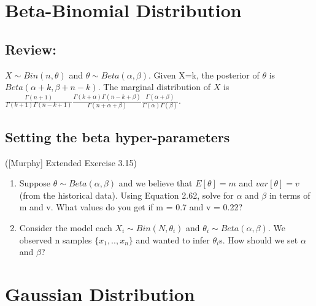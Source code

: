 \documentclass{harvardml}
\theoremstyle{definition}
\theoremstyle{plain}
\begin{document}

\section{Beta-Binomial Distribution}
\subsection{Review: }
$X\sim Bin(n, \theta)$ and $\theta\sim Beta(\alpha, \beta)$. Given X=k, the posterior of $\theta$ is $Beta(\alpha + k, \beta + n - k)$. The marginal distribution of $X$ is ${\frac  {\Gamma (n+1)}{\Gamma (k+1)\Gamma (n-k+1)}}{\frac  {\Gamma (k+\alpha )\Gamma (n-k+\beta )}{\Gamma (n+\alpha +\beta )}}{\frac  {\Gamma (\alpha +\beta )}{\Gamma (\alpha )\Gamma (\beta )}}$.
\subsection{Setting the beta hyper-parameters}
([Murphy] Extended Exercise 3.15) 
\begin{enumerate}
\item Suppose $\theta\sim Beta(\alpha, \beta)$ and we believe that $E [\theta] = m$ and $var [\theta] = v$ (from the historical data). Using Equation 2.62, solve for $\alpha$ and $\beta$ in terms of m and v. What values do you get if m = 0.7 and v = 0.22?

\item Consider the model each $X_i\sim Bin(N, \theta_i)$ and $\theta_i\sim Beta(\alpha, \beta)$. We observed n samples $\{x_1, .., x_n\}$ and wanted to infer $\theta_i$s. How should we set $\alpha$ and $\beta$? 

\end{enumerate}



\section{Gaussian Distribution}
\end{document}
